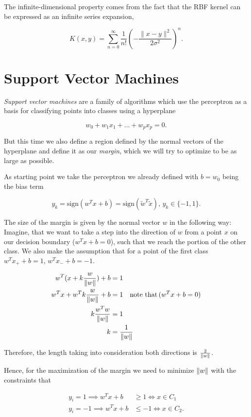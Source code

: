 The infinite-dimensional property comes from the fact that the RBF kernel can be expressed as an infinite series expansion,

\[
	K(x, y) = \sum_{n=0}^{\infty} \frac{1}{n!} \left(-\frac{\|x - y\|^2}{2\sigma^2}\right)^n.
\]

\section{Support Vector Machines}

\emph{Support vector machines} are a family of algorithms which use the perceptron as a basis for classifying points into classes using a hyperplane

\[
	w_0 + w_1 x_1 + \dots + w_p x_p = 0.
\]

But this time we also define a region defined by the normal vectors of the hyperplane and define it as our \emph{margin}, which we will try to optimize
to be as large as possible.

As starting point we take the perceptron we already defined with \(b = w_0\) being the bias term

\[
	y_k = \mathrm{sign}(w^T x + b) = \mathrm{sign}(\tilde{w}^T\tilde{x}), \,  y_k \in \{-1, 1\}.
\]


The size of the margin is given by the normal vector \(w\) in the following way: Imagine, that we want to take a step 
into the direction of \(w\) from a point \(x\) on our decision boundary (\(w^T x + b  = 0\)), such that we reach the portion of the other class.
We also make the assumption that for a point of the first class \(w^T x_{+}  + b = 1\), \(w^T x_{-} + b = -1\).

\begin{align*}	
	w^T(x + k \frac{w}{\left\| w \right\|}) + b &= 1 \\
	w^Tx + w^T k \frac{w}{\left\| w \right\|} + b &= 1 \quad \text{note that}\, (w^Tx + b = 0) \\ 
	k \frac{w^T w}{\left\| w \right\|} &= 1 \\ 
	k  &= \frac{1}{\left\| w \right\|} 
\end{align*}

Therefore, the length taking into consideration both directions is \(\frac{2}{\left\| w \right\|}\).

Hence, for the maximization of the margin we need to minimize \(\left\| w \right\|\) with the constraints that 

\begin{align*}
	y_i = 1 \implies w^T x + b &\ge 1 \iff x \in C_1 \\ 
	y_i = -1 \implies w^T x + b &\le -1 \iff x \in C_2.
\end{align*}

